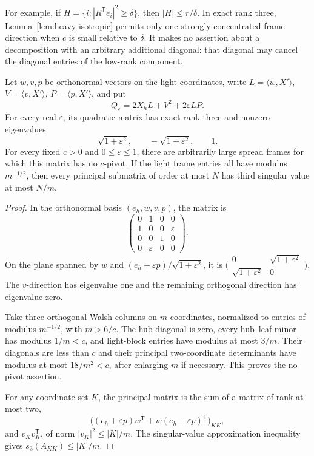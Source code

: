 For example, if \(H=\{i:|R^{\mathsf T}e_i|^2\geq\delta\}\),
then \(|H|\leq r/\delta\).  In exact rank three,
Lemma~\ref{lem:heavy-isotropic} permits only one strongly
concentrated frame direction when \(c\) is small relative
to \(\delta\).  It makes no assertion about a decomposition
with an arbitrary additional diagonal: that diagonal may
cancel the diagonal entries of the low-rank component.

\begin{proposition}
\label{prop:rank-three-epsilon}
Let \(w,v,p\) be orthonormal vectors on the light
coordinates, write
\(L=\langle w,X'\rangle\), \(V=\langle v,X'\rangle\),
\(P=\langle p,X'\rangle\), and put
\[
 Q_\varepsilon=2X_hL+V^2+2\varepsilon LP.
\]
For every real \(\varepsilon\), its quadratic matrix has
exact rank three and nonzero eigenvalues
\[
 \sqrt{1+\varepsilon^2},\qquad
 -\sqrt{1+\varepsilon^2},\qquad 1.
\]
For every fixed \(c>0\) and \(0\leq\varepsilon\leq1\),
there are arbitrarily large spread frames for which this
matrix has no \(c\)-pivot.
If the light frame entries all have modulus \(m^{-1/2}\),
then every principal submatrix of order at most \(N\)
has third singular value at most \(N/m\).
\end{proposition}
\begin{proof}
In the orthonormal basis \((e_h,w,v,p)\), the matrix is
\[
 \begin{pmatrix}
 0&1&0&0\\
 1&0&0&\varepsilon\\
 0&0&1&0\\
 0&\varepsilon&0&0
 \end{pmatrix}.
\]
On the plane spanned by \(w\) and
\((e_h+\varepsilon p)/\sqrt{1+\varepsilon^2}\), it is
\(\bigl(\begin{smallmatrix}0&\sqrt{1+\varepsilon^2}\\
\sqrt{1+\varepsilon^2}&0\end{smallmatrix}\bigr)\).
The \(v\)-direction has eigenvalue one and the remaining
orthogonal direction has eigenvalue zero.

Take three orthogonal Walsh columns on \(m\) coordinates,
normalized to entries of modulus \(m^{-1/2}\), with
\(m>6/c\).  The hub diagonal is zero, every hub--leaf
minor has modulus \(1/m<c\), and light-block entries
have modulus at most \(3/m\).
Their diagonals are less than \(c\) and their principal
two-coordinate determinants have modulus at most
\(18/m^2<c\), after enlarging \(m\) if necessary.
This proves the no-pivot assertion.

For any coordinate set \(K\), the principal matrix is
the sum of a matrix of rank at most two,
\[
 \bigl((e_h+\varepsilon p)w^{\mathsf T}
       +w(e_h+\varepsilon p)^{\mathsf T}\bigr)_{KK},
\]
and \(v_Kv_K^{\mathsf T}\), of norm
\(|v_K|^2\leq |K|/m\).
The singular-value approximation inequality gives
\(s_3(A_{KK})\leq |K|/m\).
\end{proof}

